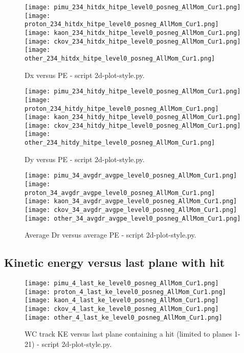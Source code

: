    \begin{figure}	   
 \centering
  \texttt{[image: pimu\_234\_hitdx\_hitpe\_level0\_posneg\_AllMom\_Cur1.png]}
   \texttt{[image: proton\_234\_hitdx\_hitpe\_level0\_posneg\_AllMom\_Cur1.png]}
     \texttt{[image: kaon\_234\_hitdx\_hitpe\_level0\_posneg\_AllMom\_Cur1.png]}
   \texttt{[image: ckov\_234\_hitdx\_hitpe\_level0\_posneg\_AllMom\_Cur1.png]}
     \texttt{[image: other\_234\_hitdx\_hitpe\_level0\_posneg\_AllMom\_Cur1.png]}

  \caption{Dx versus PE - script 2d-plot-style.py.}			
   \label{fig_detdxpe}
  \end{figure}
  

   \begin{figure}	   
 \centering
  \texttt{[image: pimu\_234\_hitdy\_hitpe\_level0\_posneg\_AllMom\_Cur1.png]}
   \texttt{[image: proton\_234\_hitdy\_hitpe\_level0\_posneg\_AllMom\_Cur1.png]}
     \texttt{[image: kaon\_234\_hitdy\_hitpe\_level0\_posneg\_AllMom\_Cur1.png]}
   \texttt{[image: ckov\_234\_hitdy\_hitpe\_level0\_posneg\_AllMom\_Cur1.png]}
     \texttt{[image: other\_234\_hitdy\_hitpe\_level0\_posneg\_AllMom\_Cur1.png]}

  \caption{Dy versus PE - script 2d-plot-style.py.}			
   \label{fig_detdype}
  \end{figure}
  
   \begin{figure}	   
 \centering
  \texttt{[image: pimu\_34\_avgdr\_avgpe\_level0\_posneg\_AllMom\_Cur1.png]}
   \texttt{[image: proton\_34\_avgdr\_avgpe\_level0\_posneg\_AllMom\_Cur1.png]}
     \texttt{[image: kaon\_34\_avgdr\_avgpe\_level0\_posneg\_AllMom\_Cur1.png]}
   \texttt{[image: ckov\_34\_avgdr\_avgpe\_level0\_posneg\_AllMom\_Cur1.png]}
     \texttt{[image: other\_34\_avgdr\_avgpe\_level0\_posneg\_AllMom\_Cur1.png]}

  \caption{Average Dr versus average PE - script 2d-plot-style.py.}			
   \label{fig_detdrpe}
  \end{figure}

\subsection{Kinetic energy versus last plane with hit}

   \begin{figure}	   
 \centering
  \texttt{[image: pimu\_4\_last\_ke\_level0\_posneg\_AllMom\_Cur1.png]}
   \texttt{[image: proton\_4\_last\_ke\_level0\_posneg\_AllMom\_Cur1.png]}
     \texttt{[image: kaon\_4\_last\_ke\_level0\_posneg\_AllMom\_Cur1.png]}
   \texttt{[image: ckov\_4\_last\_ke\_level0\_posneg\_AllMom\_Cur1.png]}
     \texttt{[image: other\_4\_last\_ke\_level0\_posneg\_AllMom\_Cur1.png]}

  \caption{WC track KE versus last plane containing a hit (limited to planes 1-21) - script 2d-plot-style.py.}			
   \label{fig_detdrpe}
  \end{figure}
  
